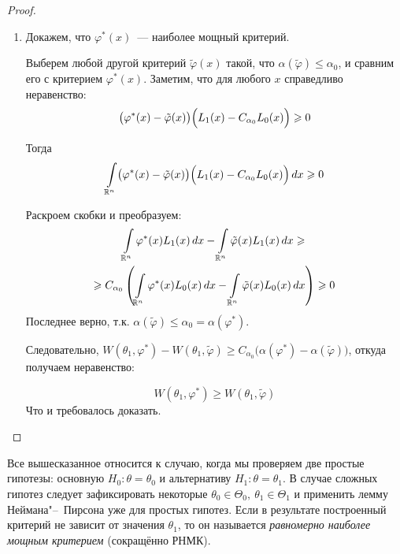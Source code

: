 \begin{proof}
\begin{enumerate}
    В обоих случаях выполнено равенство:
    \begin{equation*}
        \alpha_{0} = 
        g(C_{\alpha_{0}} + 0) + \varepsilon_{\alpha_{0}}\Bigl(g(C_{\alpha_{0}}) - g(C_{\alpha_{0}} + 0)\Bigr) =
        \alpha\left(\varphi^{*}\right)
    \end{equation*}

    \item Докажем, что $\varphi^{*}(x)$~--- наиболее мощный критерий.

    Выберем любой другой критерий $\tilde{\varphi}(x)$ такой, что $\alpha(\tilde{\varphi}) \leqslant \alpha_{0}$, 
    и сравним его с критерием $\varphi^{*}(x)$.
    Заметим, что для любого $x$ справедливо неравенство:
    \begin{equation*}
        \bigl(\varphi^{*}(x)-\tilde{\varphi}(x)\bigr) \Bigl(L_{1}(x)-C_{\alpha_{0}} L_{0}(x)\Bigr) \geqslant 0
    \end{equation*}

    Тогда
    \begin{equation*}
        \int\limits_{\mathbb{R}^{n}} \bigl(\varphi^{*}(x)-\tilde{\varphi}(x)\bigr) \Bigl(L_{1}(x)-C_{\alpha_{0}} L_{0}(x)\Bigr) \, dx \geqslant 0
    \end{equation*}

    Раскроем скобки и преобразуем:
    \begin{multline*}
        \int\limits_{\mathbb{R}^{n}} \varphi^{*}(x) L_{1}(x) \, dx - \int\limits_{\mathbb{R}^{n}} \tilde{\varphi}(x) L_{1}(x) \,dx \geqslant \\
        \geqslant C_{\alpha_{0}}\left(\int\limits_{\mathbb{R}^{n}} \varphi^{*}(x) L_{0}(x) \,dx - \int\limits_{\mathbb{R}^{n}} \tilde{\varphi}(x) L_{0}(x) \,dx\right) \geqslant 0
    \end{multline*}
    Последнее верно, т.к. $\alpha(\tilde{\varphi}) \leqslant \alpha_0 = \alpha(\varphi^*)$.
    
    \smallskip
    Следовательно, $W \left(\theta_1, \varphi^{*}\right) - W(\theta_1, \tilde{\varphi}) \geqslant C_{\alpha_{0}}\bigl(\alpha\left(\varphi^{*}\right)-\alpha(\tilde{\varphi})\bigr)$, откуда получаем неравенство:

    \begin{equation*}
        W\left(\theta_1, \varphi^{*}\right) \geqslant W(\theta_1, \tilde{\varphi})
    \end{equation*}
    Что и требовалось доказать.
    \qedhere
    \end{enumerate}
\end{proof}

\begin{rmrk}
    Все вышесказанное относится к случаю, когда мы проверяем две простые гипотезы: основную $H_0\colon \theta = \theta_0$ и альтернативу $H_1\colon \theta = \theta_1$.
    В случае сложных гипотез следует зафиксировать некоторые $\theta_0 \in \Theta_0, \: \theta_1 \in \Theta_1$ и применить лемму Неймана"--~Пирсона уже для простых гипотез.
    Если в результате построенный критерий не зависит от значения $\theta_1$, то он называется \textit{равномерно наиболее мощным критерием} (сокращённо РНМК).
\end{rmrk}
